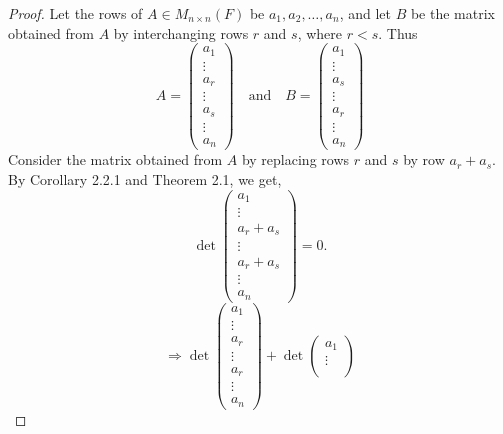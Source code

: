 \documentclass[12pt, a4paper]{article}
\theoremstyle{definition}
\theoremstyle{remark}
\begin{document}
        \begin{proof}
        Let the rows of $A \in M_{n \times n}(F)$ be $a_1, a_2, \dots, a_n$, and let $B$ be the matrix obtained from $A$ by interchanging rows $r$ and $s$, where $r < s$. Thus
        \[
        A = \begin{pmatrix}
        a_1 \\
        \vdots \\
        a_r \\
        \vdots \\
        a_s \\
        \vdots \\
        a_n
        \end{pmatrix}
        \quad \text{and} \quad
        B = \begin{pmatrix}
        a_1 \\
        \vdots \\
        a_s \\
        \vdots \\
        a_r \\
        \vdots \\
        a_n
        \end{pmatrix}
        \]
        Consider the matrix obtained from $A$ by replacing rows $r$ and $s$ by row $a_r + a_s$. By Corollary 2.2.1 and Theorem 2.1, we get,
        \[
        \det \begin{pmatrix}
        a_1 \\
        \vdots \\
        a_r + a_s \\
        \vdots \\
        a_r + a_s \\
        \vdots \\
        a_n
        \end{pmatrix} = 0.
        \]
        \[
        \Rightarrow \det \begin{pmatrix}
        a_1 \\
        \vdots \\
        a_r \\
        \vdots \\
        a_r \\
        \vdots \\
        a_n
        \end{pmatrix}
        + \det \begin{pmatrix}
        a_1 \\
        \vdots \\

\end{pmatrix}\]
\end{proof}
\end{document}
